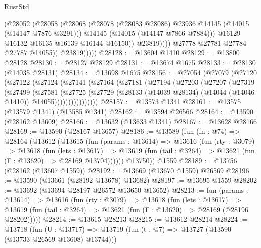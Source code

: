 \begin{lexlean}{RustStd}
\begin{coremodule}
                          (@28052
                            (@28058
                              (@28068
                                (@28078 (@28083 @28086) @23936 @14145 (@14015 (@14147 @7876 @3291)))
                                @14145
                                (@14015 (@14147 @7866 @7884)))
                              @16129
                              @16132
                              @16135
                              @16139
                              @16144
                              @16150))
                          @23819))))
                  @27778
                  @27781
                  @27784
                  @27787
                  @14055))
              @23819)))))
@28128 := @13604 @1410
@28129 := @13800 @28128
@28130 := @28127 @28129
@28131 := @13674 @1675
@28133 := @28130 (@14035 @28131)
@28134 := @13698 @1675
@28156 := @27054
    (@27079
      (@27120
        (@27122
          (@27124
            (@27141
              (@27164
                (@27181
                  (@27194
                    (@27203
                      (@27207
                        (@27319
                          (@27499
                            (@27581
                              (@27725
                                (@27729
                                  (@28133
                                    (@14039 @28134)
                                    (@14044 (@14046 @1410))
                                    @14055))))))))))))))))
@28157 := @13573 @1341
@28161 := @13575 (@13579 @1341) (@13585 @1341)
@28162 := @13594 @26566
@28164 := @13590 (@28162 @13609)
@28166 := @13632 (@13633 @1341)
@28167 := @13628 @28166
@28169 := @13590 (@28167 @13657)
@28186 := @13589
    (fun (fn : @74) =>
    @28164
      (@13612
        (@13615
          (fun (params : @13614) =>
          @13616
            (fun (rty : @3079) =>
            @13618
              (fun (lets : @13617) =>
              @13619 (fun (tail : @3264) => @13621 (fun (Γ : @13620) => @28169 @13704))))))
        @13750))
    @1559
@28189 := @13756 (@28162 (@13607 @1559))
@28192 := @13669 (@13670 @1559) @26569
@28196 := @13590 (@13661 (@28192 @13678) @13682)
@28197 := @13695 @1559
@28202 := @13692 (@13694 @28197 @26572 @13650 @13652)
@28213 := fun (params : @13614) =>
  @13616
    (fun (rty : @3079) =>
    @13618
      (fun (lets : @13617) =>
      @13619 (fun (tail : @3264) => @13621 (fun (Γ : @13620) => @28169 (@28196 @28202)))))
@28214 := @13615 @28213
@28215 := @13612 @28214
@28224 := @13718
    (fun (U : @13717) => @13719 (fun (t : @7) => @13727 (@13590 (@13733 @26569 @13608) @13744)))

\end{coremodule}
\end{lexlean}

